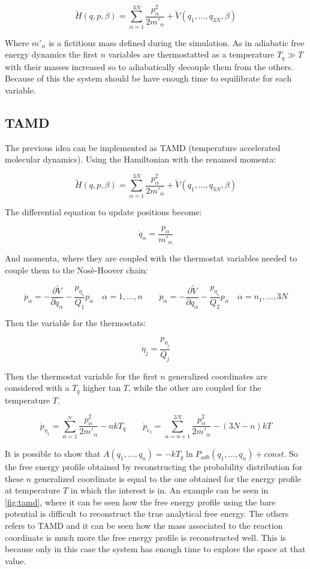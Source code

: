 $$\tilde{H}(q, p, \beta) = \sum\limits_{\alpha=1}^{3N}\frac{p_\alpha^2}{2m'_\alpha}+ \tilde{V}(q_1, \dots, q_{3N}, \beta)$$

Where $m'_\alpha$ is a fictitious mass defined during the simulation.
As in adiabatic free energy dynamics the first $n$ variables are thermostatted as a temperature $T_q\gg T$ with their masses increased so to adiabatically decouple them from the others.
Because of this the system should be have enough time to equilibrate for each variable.

	\subsection{TAMD}
	The previous idea can be implemented as TAMD (temperature accelerated molecular dynamics).
	Using the Hamiltonian with the renamed momenta:

	$$\tilde{H}(q, p, \beta) = \sum\limits_{\alpha=1}^{3N}\frac{p_\alpha^2}{2m'_\alpha} + \tilde{V}(q_1, \dots, q_{3N}, \beta)$$

	The differential equation to update positions become:

	$$\dot{q}_\alpha = \frac{p_\alpha}{m'_\alpha}$$

	And momenta, where they are coupled with the thermostat variables needed to couple them to the Nos\`e-Hoover chain:

	$$\dot{p}_\alpha = -\frac{\partial\tilde{V}}{\partial q_\alpha} - \frac{p_{\eta_1}}{Q_1}p_\alpha\quad \alpha= 1, \dots, n\qquad\dot{p}_\alpha = -\frac{\partial\tilde{V}}{\partial q_\alpha}-\frac{p_{\eta_e}}{Q_2}p_\alpha\quad \alpha = n_1, \dots, 3N$$

	Then the variable for the thermostats:

	$$\dot{\eta}_j = \frac{p_{\eta_j}}{Q_j}$$

	Then the thermostat variable for the first $n$ generalized coordinates are considered with a $T_q$ higher tan $T$, while the other are coupled for the temperature $T$.

	$$\dot{p}_{\eta_1} = \sum\limits_{\alpha=1}^n\frac{p_\alpha^2}{2m'_\alpha}-nkT_q\qquad \dot{p}_{\epsilon_2} = \sum\limits_{\alpha=n+1}^{3N}\frac{p_\alpha^2}{2m'_\alpha}-(3N-n)kT$$

	It is possible to show that $A(q_1, \dots, q_n) = -kT_q\ln P_{adb}(q_1, \dots, q_n) + const$.
	So the free energy profile obtained by reconstructing the probability distribution for these $n$ generalized coordinate is equal to the one obtained for the energy profile at temperature $T$ in which the interest is in.
	An example can be seen in \ref{fig:tamd}, where it can be seen how the free energy profile using the bare potential is difficult to reconstruct the true analytical free energy.
	The others refers to TAMD and it can be seen how the mass associated to the reaction coordinate is much more the free energy profile is reconstructed well.
	This is because only in this case the system has enough time to explore the space at that value.

